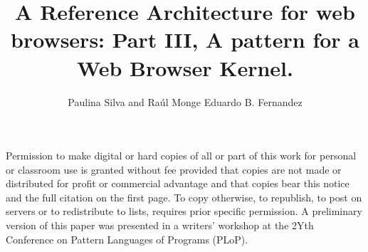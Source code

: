 \documentclass[prodmode,hillsideplop]{acmlarge}
\title{A Reference Architecture for web browsers: Part III, A pattern for a Web Browser Kernel.}
\author{
Paulina Silva and Raúl Monge
  \affil{Universidad Técnica Federico Santa María}
Eduardo B. Fernandez
  \affil{Florida Atlantic University}
}
\begin{document}

\begin{bottomstuff}
Permission to make digital or hard copies of all or part of this work for personal or classroom use is granted without fee provided that copies are not made or distributed for profit or commercial advantage and that copies bear this notice and the full citation on the first page. To copy otherwise, to republish, to post on servers or to redistribute to lists, requires prior specific permission. A preliminary version of this paper was presented in a writers' workshop at the 2Yth Conference on Pattern Languages of Programs (PLoP).
\end{bottomstuff}

\maketitle
\end{document}
